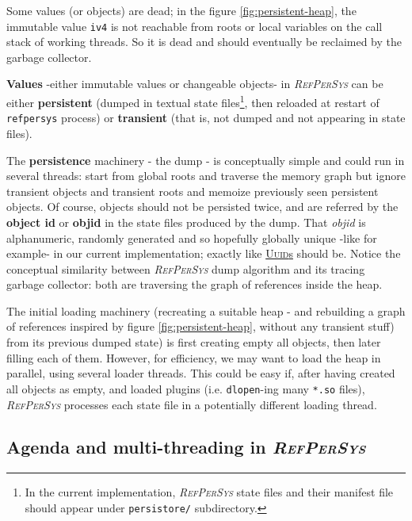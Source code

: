\documentclass[11pt,a4paper,svgnames]{article}
\newcommand{\RefPerSys}{{\textit{\textsc{RefPerSys}}}}
\begin{document}
Some values (or objects) are dead; in the figure
\ref{fig:persistent-heap}, the immutable value \texttt{iv4} is not
reachable from roots or local variables on the call stack of working
threads. So it is dead and should eventually be reclaimed by the
garbage collector.

\textbf{Values} -either immutable values or changeable objects- in
{\RefPerSys} can be either \textbf{persistent} (dumped in
textual state files\footnote{In the current implementation,
{\RefPerSys} state files and their manifest file should appear
under \texttt{persistore/} subdirectory.}, then reloaded at
restart of \texttt{refpersys} process) or \textbf{transient}
(that is, not dumped and not appearing in state files).

The \textbf{persistence} machinery - the dump - is conceptually simple
and could run in several threads: start from global roots and traverse
the memory graph but ignore transient objects and transient roots and
memoize previously seen persistent objects. Of course, objects should
not be persisted twice, and are referred by the \textbf{object id} or
\textbf{objid} in the state files produced by the dump. That
\textit{objid}  is alphanumeric, randomly generated and so hopefully
globally unique -like {}
for example- in our current implementation; exactly like
\href{https://en.wikipedia.org/wiki/Universally_unique_identifier}{\textsc{Uuid}s}
should be. Notice the conceptual similarity between {\RefPerSys} dump
algorithm and its tracing garbage collector: both are traversing the
graph of references inside the heap.

The initial loading machinery (recreating a suitable heap - and
rebuilding a graph of references inspired by figure
\ref{fig:persistent-heap}, without any transient stuff) from its
previous dumped state) is first creating empty all objects, then later
filling each of them. However, for efficiency, we may want to load the
heap in parallel, using several loader threads. This could be easy if,
after having created all objects as empty, and loaded plugins
(i.e. \texttt{dlopen}-ing many \texttt{*.so} files), {\RefPerSys}
processes each state file in a potentially different loading thread.

\bigskip

\subsection{Agenda and multi-threading in \RefPerSys}
\label{subsec:agenda-thread}
\end{document}
